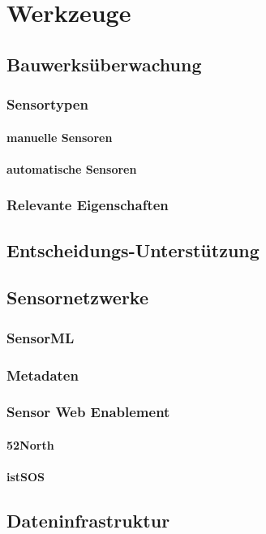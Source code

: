 \chapter{Werkzeuge}
\section{Bauwerksüberwachung}
\subsection{Sensortypen}
\subsubsection{manuelle Sensoren}
\subsubsection{automatische Sensoren}
\subsection{Relevante Eigenschaften}
\section{Entscheidungs-Unterstützung}
\section{Sensornetzwerke}
\subsection{SensorML}
\subsection{Metadaten}
\subsection{Sensor Web Enablement}
\subsubsection{52North}
\subsubsection{istSOS}
\section{Dateninfrastruktur}
